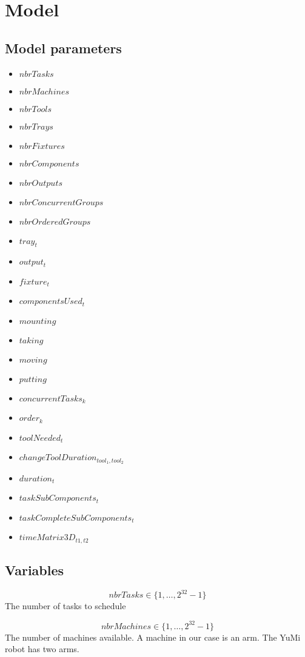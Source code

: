 \documentclass[10pt,a4paper]{report}
\begin{document}
\section*{Model}
\subsection*{Model parameters}
\begin{itemize}
\item $nbrTasks$
\item $nbrMachines$
\item $nbrTools$
\item $nbrTrays$
\item $nbrFixtures$
\item $nbrComponents$
\item $nbrOutputs$
\item $nbrConcurrentGroups$
\item $nbrOrderedGroups$
\item $tray_t$
\item $output_t$
\item $fixture_t$
\item $componentsUsed_t$
\item $mounting$
\item $taking$
\item $moving$
\item $putting$
\item $concurrentTasks_k$
\item $order_k$
\item $toolNeeded_t$
\item $changeToolDuration_{tool_1,tool_2}$
\item $duration_t$
\item $taskSubComponents_t$
\item $taskCompleteSubComponents_t$
\item $timeMatrix3D_{t1,t2}$
\end{itemize}


\subsection*{Variables}

\begin{equation}\label{eq:1}
nbrTasks \in \{1 , \ldots , 2^{32}-1\}
\end{equation}
The number of tasks to schedule

\begin{equation}\label{eq:2}
nbrMachines \in \{1 , \ldots , 2^{32}-1\}
\end{equation}
The number of machines available. A machine in our case is an arm. The YuMi robot has two arms.
\end{document}
